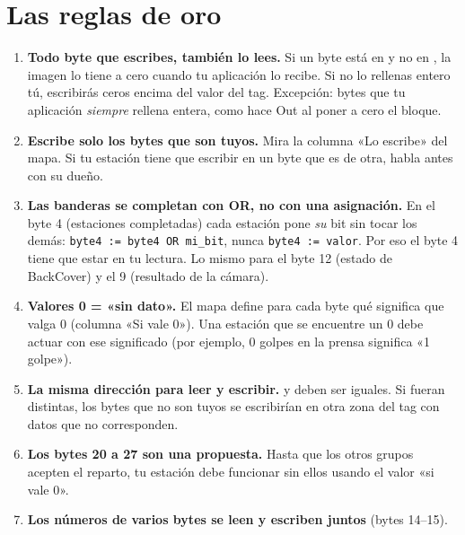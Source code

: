 \section{Las reglas de oro}\label{sec:reglas-oro}
\begin{enumerate}[leftmargin=1.2cm,label=\textbf{O\arabic*.}]
\item \textbf{Todo byte que escribes, también lo lees.} Si un byte está en  y no en , la imagen lo tiene a cero cuando tu aplicación lo recibe. Si no lo rellenas entero tú, escribirás ceros encima del valor del tag. Excepción: bytes que tu aplicación \emph{siempre} rellena entera, como hace Out al poner a cero el bloque.
\item \textbf{Escribe solo los bytes que son tuyos.} Mira la columna «Lo escribe» del mapa. Si tu estación tiene que escribir en un byte que es de otra, habla antes con su dueño.
\item \textbf{Las banderas se completan con OR, no con una asignación.} En el byte 4 (estaciones completadas) cada estación pone \emph{su} bit sin tocar los demás: \texttt{byte4 := byte4 OR mi\_bit}, nunca \texttt{byte4 := valor}. Por eso el byte 4 tiene que estar en tu lectura. Lo mismo para el byte 12 (estado de BackCover) y el 9 (resultado de la cámara).
\item \textbf{Valores 0 = «sin dato».} El mapa define para cada byte qué significa que valga 0 (columna «Si vale 0»). Una estación que se encuentre un 0 debe actuar con ese significado (por ejemplo, 0 golpes en la prensa significa «1 golpe»).
\item \textbf{La misma dirección para leer y escribir.}  y  deben ser iguales. Si fueran distintas, los bytes que no son tuyos se escribirían en otra zona del tag con datos que no corresponden.
\item \textbf{Los bytes 20 a 27 son una propuesta.} Hasta que los otros grupos acepten el reparto, tu estación debe funcionar sin ellos usando el valor «si vale 0».
\item \textbf{Los números de varios bytes se leen y escriben juntos} (bytes 14--15).
\end{enumerate}

